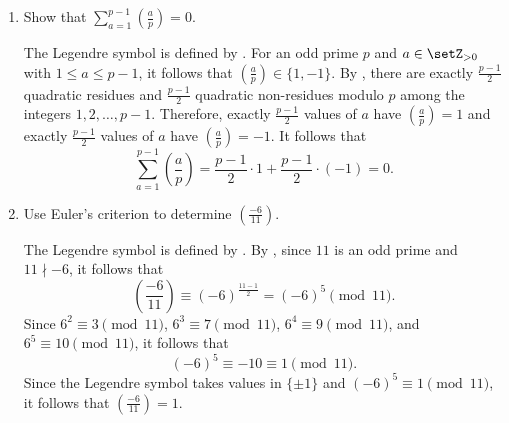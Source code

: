 \begin{enumerate}
\begin{subanswer}
    Since $401 \equiv 127 \equiv -10 \pmod{137}$, it follows that
    \[
    \left(\frac{401}{137}\right)=\left(\frac{-10}{137}\right)=\left(\frac{-1}{137}\right)\left(\frac{2}{137}\right)\left(\frac{5}{137}\right).
    \]
    By \ref{thm:4.6}, since $137 \equiv 1 \pmod{4}$, it follows that $\left(\frac{-1}{137}\right)=1$.
    By \ref{thm:4.8}, since $137 \equiv 1 \pmod{8}$, it follows that $\left(\frac{2}{137}\right)=1$.
    By , it follows that
    \[
    \left(\frac{5}{137}\right)\left(\frac{137}{5}\right)=(-1)^{\frac{5-1}{2}\cdot\frac{137-1}{2}}=1,
    \]
    so $\left(\frac{5}{137}\right)=\left(\frac{137}{5}\right)$.
    Since $137 \equiv 2 \pmod{5}$ and $\left(\frac{2}{5}\right)=-1$, it follows that $\left(\frac{5}{137}\right)=-1$.
    Therefore, $\left(\frac{137}{401}\right)=1 \cdot 1 \cdot (-1) = -1$.
    Since $\left(\frac{137}{401}\right)=-1$, the congruence $x^{2} \equiv 137 \pmod{401}$ is not solvable.
  \end{subanswer}
  
  \item Show that $\sum_{a=1}^{p-1}\left(\frac{a}{p}\right)=0$.
  \begin{subprove}
    The Legendre symbol is defined by .
    For an odd prime $p$ and $a \in \setZ_{>0}$ with $1 \leq a \leq p-1$, it follows that $\left(\frac{a}{p}\right) \in \{1, -1\}$.
    By , there are exactly $\frac{p-1}{2}$ quadratic residues and $\frac{p-1}{2}$ quadratic non-residues modulo $p$ among the integers $1, 2, \ldots, p-1$.
    Therefore, exactly $\frac{p-1}{2}$ values of $a$ have $\left(\frac{a}{p}\right) = 1$ and exactly $\frac{p-1}{2}$ values of $a$ have $\left(\frac{a}{p}\right) = -1$.
    It follows that
    \[
    \sum_{a=1}^{p-1}\left(\frac{a}{p}\right) = \frac{p-1}{2} \cdot 1 + \frac{p-1}{2} \cdot (-1) = 0.
    \]
  \end{subprove}
  
  \item Use Euler's criterion to determine $\left(\frac{-6}{11}\right)$.
  \begin{subanswer}
    The Legendre symbol is defined by .
    By , since $11$ is an odd prime and $11 \nmid -6$, it follows that
    \[
    \left(\frac{-6}{11}\right) \equiv (-6)^{\frac{11-1}{2}} = (-6)^5 \pmod{11}.
    \]
    Since $6^2 \equiv 3 \pmod{11}$, $6^3 \equiv 7 \pmod{11}$, $6^4 \equiv 9 \pmod{11}$, and $6^5 \equiv 10 \pmod{11}$, it follows that
    \[
    (-6)^5 \equiv -10 \equiv 1 \pmod{11}.
    \]
    Since the Legendre symbol takes values in $\{\pm 1\}$ and $(-6)^5 \equiv 1 \pmod{11}$, it follows that $\left(\frac{-6}{11}\right) = 1$.
  \end{subanswer}
  

\end{enumerate}
